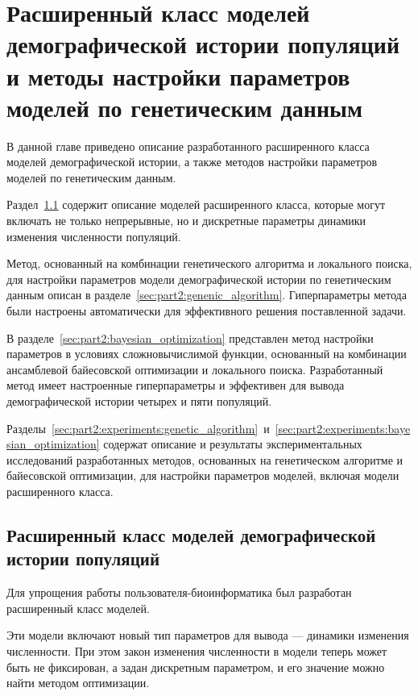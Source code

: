 \chapter{Расширенный класс моделей демографической истории популяций и методы настройки параметров моделей по генетическим данным}
\label{ch:part2}

В данной главе приведено описание разработанного расширенного класса моделей демографической истории, а также методов настройки параметров моделей по генетическим данным.

Раздел~\ref{sec:part2:new_models} содержит описание моделей расширенного класса, которые могут включать не только непрерывные, но и дискретные параметры динамики изменения численности популяций.

Метод, основанный на комбинации генетического алгоритма и локального поиска, для настройки параметров модели демографической истории по генетическим данным описан в разделе~\ref{sec:part2:genenic_algorithm}.
Гиперпараметры метода были настроены автоматически для эффективного решения поставленной задачи.

В разделе~\ref{sec:part2:bayesian_optimization} представлен метод настройки параметров в условиях сложновычислимой функции, основанный на комбинации ансамблевой байесовской оптимизации и локального поиска.
Разработанный метод имеет настроенные гиперпараметры и эффективен для вывода демографической истории четырех и пяти популяций.

Разделы~\ref{sec:part2:experiments:genetic_algorithm}~и~\ref{sec:part2:experiments:bayesian_optimization} содержат описание и результаты экспериментальных исследований разработанных методов, основанных на генетическом алгоритме и байесовской оптимизации, для настройки параметров моделей, включая модели расширенного класса.

\section{Расширенный класс моделей демографической истории популяций}
\label{sec:part2:new_models}

Для упрощения работы пользователя-биоинформатика был разработан расширенный класс моделей. 

Эти модели включают новый тип параметров для вывода --- динамики изменения численности.
При этом закон изменения численности в модели теперь может быть не фиксирован, а задан дискретным параметром, и его значение можно найти методом оптимизации.

